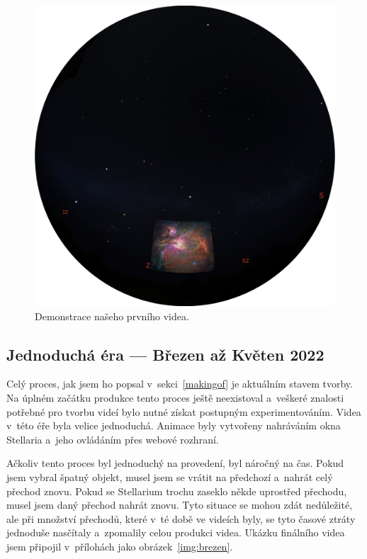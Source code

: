 \documentclass[12pt,a4paper,titlepage]{article}
\begin{document}
\begin{figure}[ht]
	\centering
	\includegraphics[width=.7\textwidth]{prosinec.eps}
	\caption{Demonstrace našeho prvního videa.}\label{img:prosinec}
\end{figure}
\subsection{Jednoduchá éra --- Březen až Květen 2022}
Celý proces, jak jsem ho popsal v~sekci~\ref{makingof} je aktuálním stavem tvorby. Na úplném začátku produkce tento proces ještě neexistoval a~veškeré znalosti potřebné pro tvorbu  videí bylo nutné získat postupným experimentováním. Videa v~této éře byla velice jednoduchá. Animace byly vytvořeny nahráváním okna Stellaria a~jeho ovládáním přes webové rozhraní. 

Ačkoliv tento proces byl jednoduchý na provedení, byl náročný na čas. Pokud jsem vybral špatný objekt, musel jsem se vrátit na předchozí a~nahrát celý přechod znovu. Pokud se Stellarium trochu zaseklo někde uprostřed přechodu, musel jsem daný přechod nahrát znovu. Tyto situace se mohou zdát nedůležité, ale při množství přechodů, které v~té době ve videích byly, se tyto časové ztráty jednoduše nasčítaly a~zpomalily celou produkci videa. Ukázku finálního videa jsem připojil v~přílohách jako obrázek~\ref{img:brezen}.
\end{document}
